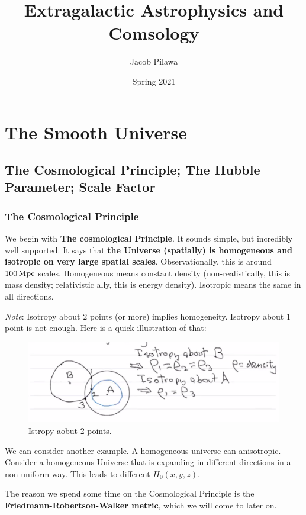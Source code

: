 \documentclass{article}
\title{Extragalactic Astrophysics and Comsology}
\author{Jacob Pilawa}
\date{Spring 2021}
\newcommand{\unit}[1]{{\,\rm #1}}
\newcommand{\Mpc}{\unit{Mpc}}
\begin{document}
\maketitle
\tableofcontents
\newpage

\section{The Smooth Universe}
\subsection{The Cosmological Principle; The Hubble Parameter; Scale Factor}

\subsubsection{The Cosmological Principle}

We begin with \textbf{The cosmological Principle}. It sounds simple, but incredibly well supported. It says that \textbf{the Universe (spatially) is homogeneous and isotropic on very large spatial scales}. Observationally, this is around $100 \Mpc$ scales. Homogeneous means constant density (non-realistically, this is mass density; relativistic ally, this is energy density). Isotropic means the same in all directions. 

\textit{Note}: Isotropy about $2$ points (or more) implies homogeneity. Isotropy about $1$ point is not enough. Here is a quick illustration of that: 

\begin{figure}
    \centering
    \includegraphics{isotropy.png}
    \caption{Istropy aobut 2 points.}
    \label{fig:isotropy}
\end{figure}

We can consider another example. A homogeneous universe can anisotropic. Consider a homogeneous Universe that is expanding in different directions in a non-uniform way. This leads to different $H_0(x,y,z)$. 

The reason we spend some time on the Cosmological Principle is the \textbf{Friedmann-Robertson-Walker metric}, which we will come to later on.
\end{document}
